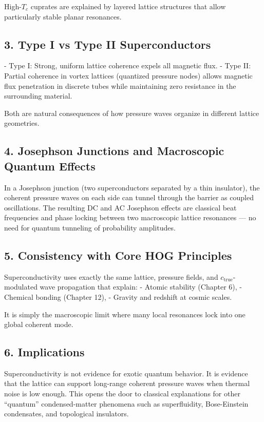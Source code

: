 \documentclass[11pt,a4paper]{book}
\begin{document}
{High-\( T_c \) cuprates are explained by layered lattice structures that allow particularly stable planar resonances.

\subsection{3. Type I vs Type II Superconductors}
- Type I: Strong, uniform lattice coherence expels all magnetic flux.
- Type II: Partial coherence in vortex lattices (quantized pressure nodes) allows magnetic flux penetration in discrete tubes while maintaining zero resistance in the surrounding material.

Both are natural consequences of how pressure waves organize in different lattice geometries.

\subsection{4. Josephson Junctions and Macroscopic Quantum Effects}
In a Josephson junction (two superconductors separated by a thin insulator), the coherent pressure waves on each side can tunnel through the barrier as coupled oscillations. The resulting DC and AC Josephson effects are classical beat frequencies and phase locking between two macroscopic lattice resonances — no need for quantum tunneling of probability amplitudes.

\subsection{5. Consistency with Core HOG Principles}
Superconductivity uses exactly the same lattice, pressure fields, and \( c_{\text{true}} \)-modulated wave propagation that explain:
- Atomic stability (Chapter 6),
- Chemical bonding (Chapter 12),
- Gravity and redshift at cosmic scales.

It is simply the macroscopic limit where many local resonances lock into one global coherent mode.

\subsection{6. Implications}
Superconductivity is not evidence for exotic quantum behavior. It is evidence that the lattice can support long-range coherent pressure waves when thermal noise is low enough. This opens the door to classical explanations for other “quantum” condensed-matter phenomena such as superfluidity, Bose-Einstein condensates, and topological insulators.

}
\end{document}
